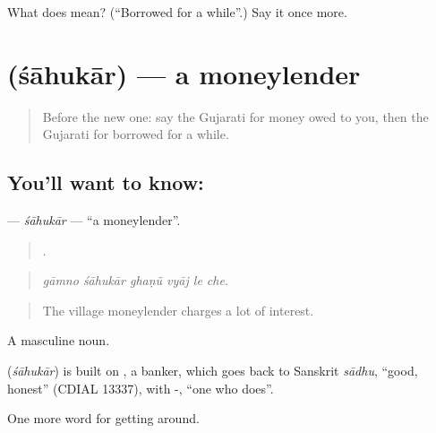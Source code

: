 \begin{tcolorbox}[breakable,colback=teal!4,colframe=teal!35!black,title={Before you move on}]
What does  mean? (\textquotedblleft{}Borrowed for a while\textquotedblright{}.) Say it once more.
\end{tcolorbox}
\section[\texorpdfstring{\gu{શાહુકાર} (śāhukār)}{શાહુકાર (śāhukār)}]{ (śāhukār) — a moneylender}

\label{lesson:GU-C428-sahukar}



\begin{quote}
Before the new one: say the Gujarati for money owed to you, then the Gujarati for borrowed for a while.
\end{quote}

\subsection*{You'll want to know: }
\textbf{} — \emph{śāhukār} — \textquotedblleft{}a moneylender\textquotedblright{}.

\begin{quote}
     .
\end{quote}

\begin{quote}
\emph{gāmno śāhukār ghaṇũ vyāj le che.}
\end{quote}

\begin{quote}
The village moneylender charges a lot of interest.
\end{quote}

A masculine noun.

\begin{cousinweb}
\textbf{} (\emph{śāhukār}) is built on , a banker, which goes back to Sanskrit \emph{sādhu}, \textquotedblleft{}good, honest\textquotedblright{} (CDIAL 13337), with -, \textquotedblleft{}one who does\textquotedblright{}.
\end{cousinweb}

\begin{grammarlens}[title={What you've built}]
One more word for getting around.
\end{grammarlens}

